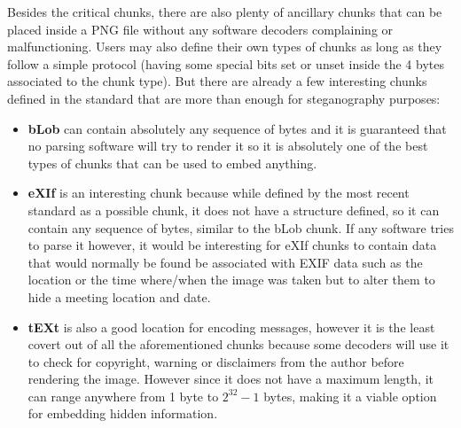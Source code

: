 
Besides the critical chunks, there are also plenty of ancillary chunks that can be placed inside a PNG file without any software decoders complaining or malfunctioning. Users may also define their own types of chunks as long as they follow a simple protocol (having some special bits set or unset inside the 4 bytes associated to the chunk type). But there are already a few interesting chunks defined in the standard that are more than enough for steganography purposes:
\begin{itemize}
	\item \textbf{bLob} can contain absolutely any sequence of bytes and it is guaranteed that no parsing software will try to render it so it is absolutely one of the best types of chunks that can be used to embed anything.
	\item \textbf{eXIf} is an interesting chunk because while defined by the most recent standard as a possible chunk, it does not have a structure defined, so it can contain any sequence of bytes, similar to the bLob chunk. If any software tries to parse it however, it would be interesting for eXIf chunks to contain data that would normally be found be associated with EXIF data such as the location or the time where/when the image was taken but to alter them to hide a meeting location and date.
	\item \textbf{tEXt} is also a good location for encoding messages, however it is the least covert out of all the aforementioned chunks because some decoders will use it to check for copyright, warning or disclaimers from the author before rendering the image. However since it does not have a maximum length, it can range anywhere from 1 byte to $2^{32}-1$ bytes, making it a viable option for embedding hidden information.
\end{itemize}

